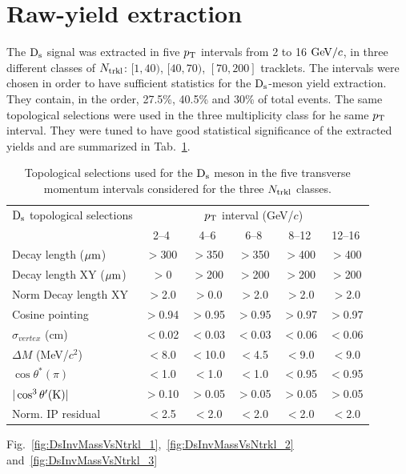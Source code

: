 \section {Raw-yield extraction}
\label{sec:Rawyields_vs_mult}
The ${\rm D_s}$ signal was extracted in five $p_{\rm T}$ intervals from 2 to 16 $\mathrm{GeV}/c$, 
in three different classes of $N_{\rm trkl}$: $[1,40)$, $[40,70)$, $[70,200]$ tracklets.
The intervals were chosen in order to have sufficient statistics for the ${\rm D_s}$-meson yield extraction.
They contain, in the order, 27.5\%, 40.5\% and 30\% of total events.
The same topological selections were used in the three multiplicity class for he same $p_{\rm T}$
interval. They were tuned to have good statistical significance of the extracted yields
and are summarized in Tab.~\ref{tab:cutsDsVsNtrkl}.
\begin{table}[h!]
\centering
\begin{tabular}{|l|c|c|c|c|c|}
\hline
${\rm D_s}$ topological selections & \multicolumn{5}{c|}{$p_{\rm T}$ interval (GeV/$c$)}\\
\cline{2-6}
  & 2--4  & 4--6 & 6--8 & 8--12 & 12--16\\
\hline
Decay length ($\mathrm{\mu m}$)        & $>$300 & $>$350 & $>$350 & $>$400& $>$400\\
Decay length XY ($\mathrm{\mu m}$)     & $>$0 & $>$200 & $>$200 & $>$200 & $>$200\\
Norm Decay length XY          & $>$2.0& $>$0.0 & $>$2.0 & $>$2.0 & $>$2.0\\
Cosine pointing              & $>$0.94 & $>$0.95 & $>$0.95 & $>$0.97 & $>$0.97\\
$\sigma_{vertex}$  (cm)          & $<$0.02 & $<$0.03 & $<$0.03 & $<$0.06 & $<$0.06\\
$\Delta M$ (MeV/$c^{2}$) & $<$8.0 & $<$10.0 & $<$4.5 & $<$9.0 & $<$9.0\\
$\cos \theta^*(\pi)$    & $<$1.0 & $<$1.0 & $<$1.0 & $<$0.95 & $<$0.95\\
$|\cos^3 \theta^\prime({\rm K})|$        & $>$0.10 & $>$0.05 & $>$0.05 & $>$0.05 & $>$0.05\\
Norm. IP residual  & $<$2.5 & $<$2.0 & $<$2.0 & $<$2.0  & $<$2.0 \\
\hline
\end{tabular}
\caption{Topological selections used for the ${\rm D_s}$ meson in the five transverse momentum intervals considered for the three $N_{\rm trkl}$ classes.}
\label{tab:cutsDsVsNtrkl}
\end{table}
Fig.~\ref{fig:DsInvMassVsNtrkl_1},~\ref{fig:DsInvMassVsNtrkl_2} and~\ref{fig:DsInvMassVsNtrkl_3} 
